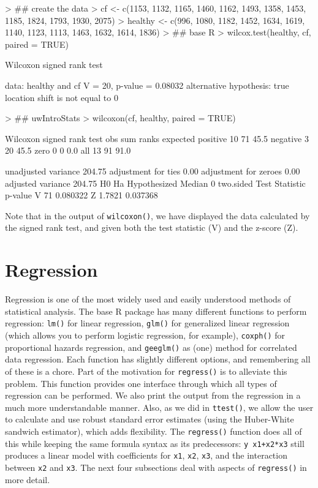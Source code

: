 \documentclass[landscape]{article}
\renewenvironment{Schunk}{\vspace{\topsep}}{\vspace{\topsep}}
\begin{document}
\begin{Schunk}
\begin{Sinput}
> ## create the data
> cf <- c(1153, 1132, 1165, 1460, 1162, 1493, 1358, 1453, 1185, 1824, 1793, 1930, 2075)
> healthy <- c(996, 1080, 1182, 1452, 1634, 1619, 1140, 1123, 1113, 1463, 1632, 1614, 1836)
> ## base R
> wilcox.test(healthy, cf, paired = TRUE)
\end{Sinput}
\begin{Soutput}
	Wilcoxon signed rank test

data:  healthy and cf
V = 20, p-value = 0.08032
alternative hypothesis: true location shift is not equal to 0
\end{Soutput}
\begin{Sinput}
> ## uwIntroStats
> wilcoxon(cf, healthy, paired = TRUE)
\end{Sinput}
\begin{Soutput}
 Wilcoxon signed rank test 
         obs sum ranks expected
positive  10        71     45.5
negative   3        20     45.5
zero       0         0      0.0
all       13        91     91.0
                            
unadjusted variance   204.75
adjustment for ties     0.00
adjustment for zeroes   0.00
adjusted variance     204.75
                    H0 Ha       
Hypothesized Median 0  two.sided
  Test Statistic p-value 
V 71             0.080322
Z 1.7821         0.037368
\end{Soutput}
\end{Schunk}

Note that in the output of \texttt{wilcoxon()}, we have displayed the data calculated by the signed rank test, and given both the test statistic (V) and the z-score (Z).

\section{Regression}
Regression is one of the most widely used and easily understood methods of statistical analysis. The base R package has many different functions to perform regression: \texttt{lm()} for linear regression, \texttt{glm()} for generalized linear regression (which allows you to perform logistic regression, for example), \texttt{coxph()} for proportional hazards regression, and \texttt{geeglm()} as (one) method for correlated data regression. Each function has slightly different options, and remembering all of these is a chore. Part of the motivation for \texttt{regress()} is to alleviate this problem. This function provides one interface through which all types of regression can be performed. We also print the output from the regression in a much more understandable manner. Also, as we did in \texttt{ttest()}, we allow the user to calculate and use robust standard error estimates (using the Huber-White sandwich estimator), which adds flexibility. The \texttt{regress()} function does all of this while keeping the same formula syntax as its predecessors: \texttt{y~x1+x2*x3} still produces a linear model with coefficients for \texttt{x1}, \texttt{x2}, \texttt{x3}, and the interaction between \texttt{x2} and \texttt{x3}. The next four subsections deal with aspects of \texttt{regress()} in more detail.
\end{document}

